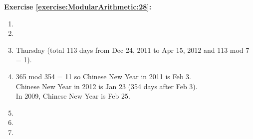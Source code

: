 \noindent\textbf{Exercise \ref{exercise:ModularArithmetic:28}:}
\begin{enumerate}
\item

\item

\item
Thursday (total 113 days from Dec 24, 2011 to Apr 15, 2012 and 113 mod 7 = 1).

\item
365 mod 354 = 11 so Chinese New Year in 2011 is Feb 3.\\
Chinese New Year in 2012 is Jan 23 (354 days after Feb 3).\\
In 2009, Chinese New Year is Feb 25.\\

\item

\item

\item
\end{enumerate}

